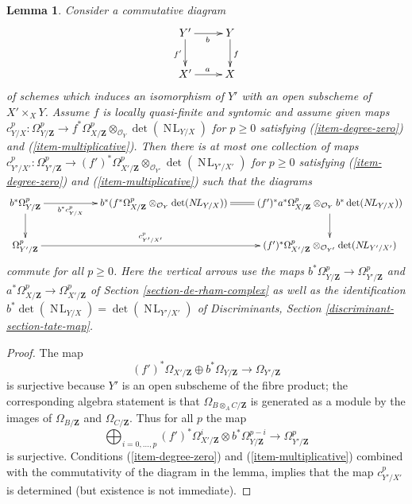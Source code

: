 \documentclass[10pt,a4paper]{amsart}
\theoremstyle{plain}
\newtheorem{lemma}[subsection]{Lemma}
\theoremstyle{definition}
\theoremstyle{remark}
\numberwithin{equation}{subsection}
\def\NL{\mathop{N\!L}\nolimits}
\begin{document}
\begin{lemma}
\label{lemma-base-change-Garel-upstairs}
Consider a commutative diagram
$$
\xymatrix{
Y' \ar[d]_{f'} \ar[r]_b & Y \ar[d]^f \\
X' \ar[r]^a & X
}
$$
of schemes which induces an isomorphism of $Y'$ with an open subscheme of
$X' \times_X Y$. Assume $f$ is locally quasi-finite and syntomic and
assume given maps $c^p_{Y/X} : \Omega^p_{Y/\mathbf{Z}} \to
f^*\Omega^p_{X/\mathbf{Z}} \otimes_{\mathcal{O}_Y} \det(\NL_{Y/X})$
for $p \geq 0$ satisfying
(\ref{item-degree-zero}) and (\ref{item-multiplicative}).
Then there is at most one collection of maps
$c^p_{Y'/X'} : \Omega^p_{Y'/\mathbf{Z}} \to
(f')^*\Omega^p_{X'/\mathbf{Z}} \otimes_{\mathcal{O}_{Y'}} \det(\NL_{Y'/X'})$
for $p \geq 0$
satisfying (\ref{item-degree-zero}) and (\ref{item-multiplicative})
such that the diagrams
$$
\xymatrix{
b^*\Omega^p_{Y/\mathbf{Z}} \ar[rr]_-{b^*c^p_{Y/X}} \ar[d] & &
b^*(f^*\Omega^p_{X/\mathbf{Z}} \otimes_{\mathcal{O}_Y} \det(\NL_{Y/X}))
\ar@{=}[r] &
(f')^*a^*\Omega^p_{X/\mathbf{Z}} \otimes_{\mathcal{O}_Y} b^*\det(\NL_{Y/X}))
\ar[d] \\
\Omega^p_{Y'/\mathbf{Z}} \ar[rrr]^-{c^p_{Y'/X'}} & & &
(f')^*\Omega^p_{X'/\mathbf{Z}} \otimes_{\mathcal{O}_{Y'}} \det(\NL_{Y'/X'})
}
$$
commute for all $p \geq 0$. Here the vertical arrows use the maps
$b^*\Omega^p_{Y/\mathbf{Z}} \to \Omega^p_{Y'/\mathbf{Z}}$ and
$a^*\Omega^p_{X/\mathbf{Z}} \to \Omega^p_{X'/\mathbf{Z}}$
of Section \ref{section-de-rham-complex}
as well as the identification $b^*\det(\NL_{Y/X}) = \det(\NL_{Y'/X'})$ of
Discriminants, Section \ref{discriminant-section-tate-map}.
\end{lemma}

\begin{proof}
The map
$$
(f')^*\Omega_{X'/\mathbf{Z}} \oplus b^*\Omega_{Y/\mathbf{Z}}
\longrightarrow
\Omega_{Y'/\mathbf{Z}}
$$
is surjective because $Y'$ is an open subscheme of the fibre product;
the corresponding algebra statement is that $\Omega_{B \otimes_A C/\mathbf{Z}}$
is generated as a module by the images of $\Omega_{B/\mathbf{Z}}$ and
$\Omega_{C/\mathbf{Z}}$. Thus for all $p$ the map
$$
\bigoplus\nolimits_{i = 0, \ldots, p}
(f')^*\Omega^i_{X'/\mathbf{Z}} \otimes
b^*\Omega^{p - i}_{Y/\mathbf{Z}}
\longrightarrow
\Omega^p_{Y'/\mathbf{Z}}
$$
is surjective. Conditions (\ref{item-degree-zero}) and
(\ref{item-multiplicative}) combined with the commutativity
of the diagram in the lemma, implies that the map $c^p_{Y'/X'}$
is determined (but existence is not immediate).
\end{proof}
\end{document}
